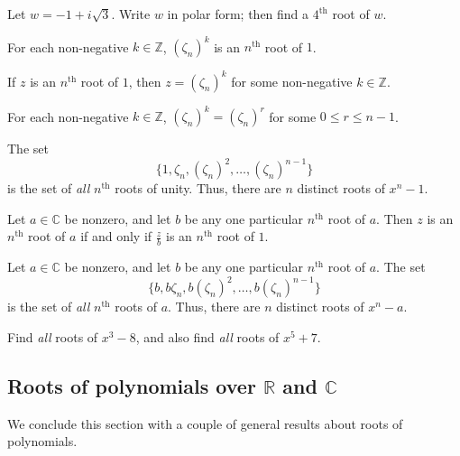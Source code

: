 \begin{problem}\label{prob.nthRoots}
Let $w = -1 + i\sqrt{3}$. Write $w$ in polar form; then find a $4^\text{th}$ root of $w$.
\end{problem}

\begin{theorem}
For each non-negative $k\in \mathbb{Z}$, $(\zeta_n)^k$ is an $n^\text{th}$ root of $1$.
\end{theorem}

\begin{lemma}\label{lem.nthRoot1IsPowerOfZeta}
If $z$ is an $n^\text{th}$ root of $1$, then $z = (\zeta_n)^k$ for some non-negative $k\in \mathbb{Z}$.
\end{lemma}

\begin{lemma}\label{lem.ReducePowerOfZeta}
For each non-negative $k\in \mathbb{Z}$, $(\zeta_n)^k = (\zeta_n)^r$ for some $0\le r \le n-1$.
\end{lemma}

\begin{theorem}\label{thm.nthRoots1}
The set \[\{1, \zeta_n, (\zeta_n)^2, \ldots, (\zeta_n)^{n-1}\}\] is the set of \emph{all} $n^\text{th}$ roots of unity. Thus, there are $n$ distinct roots of $x^n-1$. 
\end{theorem}

\begin{lemma}
Let $a\in \mathbb{C}$ be nonzero, and let $b$ be any one particular $n^\text{th}$ root of $a$. Then $z$ is an $n^\text{th}$ root of $a$ if and only if $\frac{z}{b}$ is an $n^\text{th}$ root of $1$.
\end{lemma}

\begin{theorem}\label{thm.nthRoots}
Let $a\in \mathbb{C}$ be nonzero, and let $b$ be any one particular $n^\text{th}$ root of $a$. The set \[\{b, b\zeta_n, b(\zeta_n)^2, \ldots, b(\zeta_n)^{n-1}\}\] is the set of \emph{all} $n^\text{th}$ roots of $a$. Thus, there are $n$ distinct roots of $x^n-a$. 
\end{theorem}

\begin{problem}
Find \emph{all} roots of $x^3 - 8$, and also find \emph{all} roots of  $x^5 + 7$.
\end{problem}

\subsection{Roots of polynomials over  $\mathbb{R}$ and  $\mathbb{C}$}
We conclude this section with a couple of general results about roots of polynomials.

